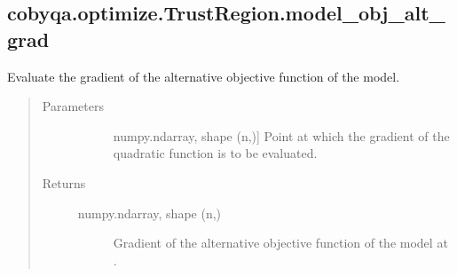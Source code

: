 \documentclass[letterpaper,10pt,english]{sphinxmanual}
\begin{document}
\begin{fulllineitems}
\begin{fulllineitems}
\begin{quote}
\begin{description}
\begin{description}
\end{description}

\end{description}\end{quote}

\end{fulllineitems}



\subsection{cobyqa.optimize.TrustRegion.model\_obj\_alt\_grad}
\label{\detokenize{refs/generated/cobyqa.optimize.TrustRegion.model_obj_alt_grad:cobyqa-optimize-trustregion-model-obj-alt-grad}}\label{\detokenize{refs/generated/cobyqa.optimize.TrustRegion.model_obj_alt_grad::doc}}

\begin{fulllineitems}
\label{\detokenize{refs/generated/cobyqa.optimize.TrustRegion.model_obj_alt_grad:cobyqa.optimize.TrustRegion.model_obj_alt_grad}}
\sphinxAtStartPar
Evaluate the gradient of the alternative objective function of the
model.
\begin{quote}\begin{description}
\item[{Parameters}] \leavevmode\begin{description}
\item[{}] \leavevmode{[}numpy.ndarray, shape (n,){]}
\sphinxAtStartPar
Point at which the gradient of the quadratic function is to be
evaluated.

\end{description}

\item[{Returns}] \leavevmode\begin{description}
\item[{numpy.ndarray, shape (n,)}] \leavevmode
\sphinxAtStartPar
Gradient of the alternative objective function of the model at .

\end{description}

\end{description}\end{quote}


\end{fulllineitems}
\end{fulllineitems}
\end{document}
